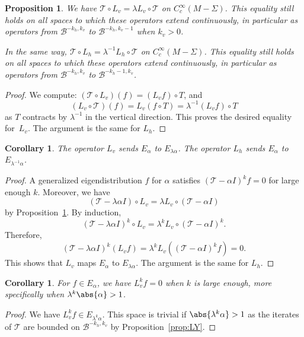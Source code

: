 \documentclass[10pt]{amsart}
\newcommand{\boB}{\mathcal{B}}
\newcommand{\boT}{\mathcal{T}}
\newtheorem{prop}[thm]{Proposition}
\newtheorem{cor}[thm]{Corollary}
\theoremstyle{definition}
\numberwithin{equation}{section}
\begin{document}
\begin{prop}
\label{prop:action_Lv} We have $\boT \circ L_v = \lambda L_v \circ \boT$ on
$C^\infty_c(M-\Sigma)$. This equality still holds on all spaces to which
these operators extend continuously, in particular as operators from
$\boB^{-k_h, k_v}$ to $\boB^{-k_h, k_v-1}$ when $k_v>0$.

In the same way, $\boT \circ L_h = \lambda^{-1} L_h \circ \boT$ on
$C^\infty_c(M-\Sigma)$. This equality still holds on all spaces to which
these operators extend continuously, in particular as operators from
$\boB^{-k_h, k_v}$ to $\boB^{-k_h-1, k_v}$.
\end{prop}
\begin{proof}
We compute: $(\boT \circ L_v)(f) = (L_v f) \circ T$, and 
\[
(L_v \circ \boT)(f)
= L_v (f \circ T) = \lambda^{-1} (L_v f)\circ T
\]
as $T$ contracts by
$\lambda^{-1}$ in the vertical direction. This proves the desired equality
for~$L_v$. The argument is the same for $L_h$.
\end{proof}

\begin{cor}
\label{cor:Lu_Ls_Erho} The operator $L_v$ sends $E_\alpha$ to
$E_{\lambda\alpha}$. The operator $L_h$ sends $E_\alpha$ to
$E_{\lambda^{-1}\alpha}$.
\end{cor}
\begin{proof}
A generalized eigendistribution $f$ for $\alpha$ satisfies $(\boT-\alpha I)^k
f= 0$ for large enough $k$. Moreover, we have
\[
(\boT -\lambda \alpha I) \circ
L_v = \lambda L_v \circ (\boT - \alpha I)
\]
by
Proposition~\ref{prop:action_Lv}. By induction,
\[
(\boT -\lambda \alpha I)^k
\circ L_v = \lambda^k L_v \circ (\boT-\alpha I)^k.
\]
Therefore,
\[
(\boT
-\lambda \alpha I)^k (L_v f) = \lambda^k L_v ( (\boT-\alpha I)^k f) = 0.
\]
This shows that $L_v$ maps $E_\alpha$ to $E_{\lambda \alpha}$. The argument
is the same for $L_h$.
\end{proof}

\begin{cor}
\label{cor:iter_Lv_0} For $f \in E_\alpha$, we have $L_v^k f = 0$ when $k$ is
large enough, more specifically when $\lambda^k \abs{\alpha}>1$.
\end{cor}
\begin{proof}
We have $L_v^k f \in E_{\lambda^k \alpha}$. This space is trivial if
$\abs{\lambda^k \alpha}>1$ as the iterates of $\boT$ are bounded on
$\boB^{-k_h, k_v}$ by Proposition~\ref{prop:LY}.
\end{proof}
\end{document}

